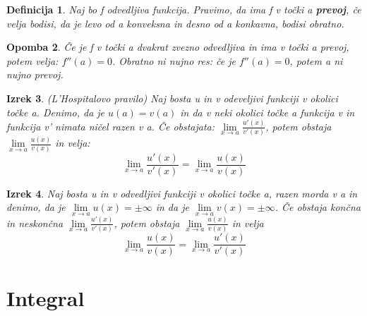 \documentclass[11pt]{article}
\newtheorem{Izrek}{{\sc Izrek}}[section]
\newtheorem{Definicija}[Izrek]{{\sc Definicija}}
\newtheorem{Opomba}[Izrek]{{\sc Opomba}}
\begin{document}
\begin{Definicija}
	Naj bo f odvedljiva funkcija. Pravimo, da ima f v točki a \textbf{prevoj}, če velja bodisi, da je levo od a konveksna in desno od a konkavna, bodisi obratno.
\end{Definicija}
\begin{Opomba}
	Če je f v točki a dvakrat zvezno odvedljiva in ima v točki a prevoj, potem velja: $f''(a)= 0$. Obratno ni nujno res: če je $f''(a) = 0$, potem a ni nujno prevoj.
\end{Opomba}
\begin{Izrek}
	(L'Hospitalovo pravilo) Naj bosta u in v odeveljivi funkciji v okolici točke a. Denimo, da je $u(a) = v(a)$ in da v neki okolici točke a funkcija v in funkcija v' nimata ničel razen v a. Če obstajata:
	$\lim\limits_{x \to a}{\frac{u'(x)}{v'(x)}}$, potem obstaja $\lim\limits_{x \to a}{\frac{u(x)}{v(x)}}$ in velja:
	$$\lim\limits_{x \to a}{\frac{u'(x)}{v'(x)}} = \lim\limits_{x \to a}{\frac{u(x)}{v(x)}}$$
\end{Izrek}
\begin{Izrek}
	Naj bosta u in v odvedljivi funkciji v okolici točke a, razen morda v a in denimo, da je $\lim\limits_{x \to a}{u(x)} = \pm \infty$ in da je $\lim\limits_{x \to a}{v(x)} = \pm \infty$. Če obstaja končna in neskončna  $\lim\limits_{x \to a}{\frac{u'(x)}{v'(x)}}$, potem obstaja  $\lim\limits_{x \to a}{\frac{u(x)}{v(x)}}$ in velja
	$$ \lim\limits_{x \to a}{\frac{u(x)}{v(x)}} =  \lim\limits_{x \to a}{\frac{u'(x)}{v'(x)}}$$
\end{Izrek}
\section{Integral}
\end{document}
